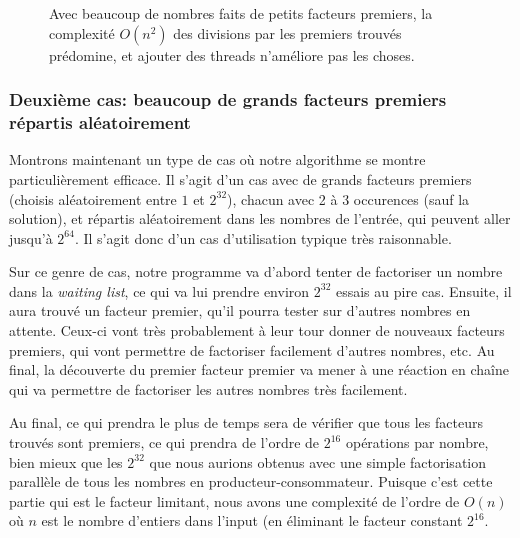 \documentclass[a4paper,10pt]{article}
\begin{document}
\begin{figure}[t!]
    \centering
    \caption{Avec beaucoup de nombres faits de petits facteurs premiers, la complexité $O(n^2)$ des divisions par les premiers trouvés prédomine, et ajouter des threads n'améliore pas les choses.}
    \label{fig:many-small-primes}
\end{figure}

\newpage
\subsubsection*{Deuxième cas: beaucoup de grands facteurs premiers répartis aléatoirement}

Montrons maintenant un type de cas où notre algorithme se montre particulièrement efficace. Il s'agit d'un cas avec de grands facteurs premiers (choisis aléatoirement entre $1$ et $2^{32}$), chacun avec 2 à 3 occurences (sauf la solution), et répartis aléatoirement dans les nombres de l'entrée, qui peuvent aller jusqu'à $2^{64}$. Il s'agit donc d'un cas d'utilisation typique très raisonnable.

Sur ce genre de cas, notre programme va d'abord tenter de factoriser un nombre dans la \emph{waiting list}, ce qui va lui prendre environ $2^{32}$ essais au pire cas. Ensuite, il aura trouvé un facteur premier, qu'il pourra tester sur d'autres nombres en attente. Ceux-ci vont très probablement à leur tour donner de nouveaux facteurs premiers, qui vont permettre de factoriser facilement d'autres nombres, etc. Au final, la découverte du premier facteur premier va mener à une réaction en chaîne qui va permettre de factoriser les autres nombres très facilement.

Au final, ce qui prendra le plus de temps sera de vérifier que tous les facteurs trouvés sont premiers, ce qui prendra de l'ordre de $2^{16}$ opérations par nombre, bien mieux que les $2^{32}$ que nous aurions obtenus avec une simple factorisation parallèle de tous les nombres en producteur-consommateur. Puisque c'est cette partie qui est le facteur limitant, nous avons une complexité de l'ordre de $O(n)$ où $n$ est le nombre d'entiers dans l'input (en éliminant le facteur constant $2^{16}$.
\end{document}
